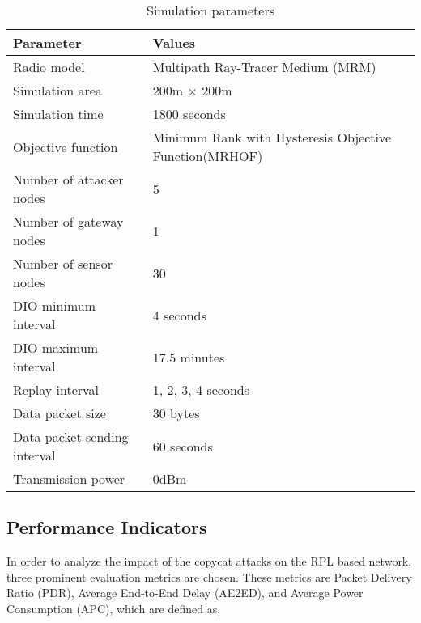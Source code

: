 \documentclass[]{svjour3}                     %
\begin{document}
\begin{table}[!h]
	\centering
	\caption{Simulation parameters}
	\begin{tabular}{|l|p{4.5cm}|}
		\hline
		\textbf{Parameter} & \textbf{Values}\\ \hline
		Radio model & Multipath Ray-Tracer Medium (MRM) \\ \hline
		Simulation area & 200m $ \times $ 200m\\ \hline
		Simulation time & 1800 seconds \\ \hline
		Objective function & Minimum Rank with Hysteresis Objective Function(MRHOF) \\ \hline
		Number of attacker nodes & 5 \\ \hline
		Number of gateway nodes & 1 \\ \hline
		Number of sensor nodes & 30 \\ \hline
		DIO minimum interval & 4 seconds \\ \hline
		DIO maximum interval & 17.5 minutes \\ \hline
		Replay interval & 1, 2, 3, 4 seconds \\ \hline
		Data packet size & 30 bytes \\\hline
		Data packet sending interval & 60 seconds \\ \hline
		Transmission power & 0dBm \\\hline
		
	\end{tabular} \label{table4}
\end{table}


\subsection{Performance Indicators}
In order to analyze the impact of the copycat attacks on the RPL based network, three prominent evaluation metrics are chosen. These metrics are Packet Delivery Ratio (PDR), Average End-to-End Delay (AE2ED), and Average Power Consumption (APC), which are defined as, 
\end{document}
